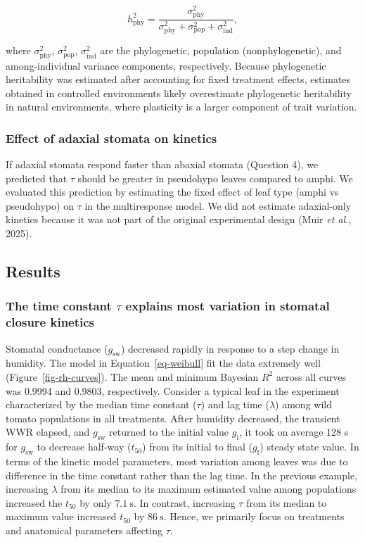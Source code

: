 \documentclass[
  letterpaper,
  DIV=11,
  numbers=noendperiod]{scrartcl}
\newcommand{\gi}{$g_\mathrm{i}$}
\newcommand{\gf}{$g_\mathrm{f}$}
\newcommand{\gsw}{$g_\mathrm{sw}$}
\begin{document}
\[h^2_{\mathrm{phy}} = \frac{\sigma^2_\mathrm{phy}}{\sigma^2_\mathrm{phy} + \sigma^2_\mathrm{pop} + \sigma^2_\mathrm{ind}},\]

where \(\sigma^2_\mathrm{phy}\), \(\sigma^2_\mathrm{pop}\),
\(\sigma^2_\mathrm{ind}\) are the phylogenetic, population
(nonphylogenetic), and among-individual variance components,
respectively. Because phylogenetic heritability was estimated after
accounting for fixed treatment effects, estimates obtained in controlled
environments likely overestimate phylogenetic heritability in natural
environments, where plasticity is a larger component of trait variation.

\subsubsection{Effect of adaxial stomata on
kinetics}\label{effect-of-adaxial-stomata-on-kinetics}

If adaxial stomata respond faster than abaxial stomata (Question 4), we
predicted that \(\tau\) should be greater in pseudohypo leaves compared
to amphi. We evaluated this prediction by estimating the fixed effect of
leaf type (amphi vs pseudohypo) on \(\tau\) in the multiresponse model.
We did not estimate adaxial-only kinetics because it was not part of the
original experimental design (Muir \emph{et al.}, 2025).

\subsection{Results}\label{results}

\subsubsection{\texorpdfstring{The time constant \(\tau\) explains most
variation in stomatal closure
kinetics}{The time constant \textbackslash tau explains most variation in stomatal closure kinetics}}\label{the-time-constant-tau-explains-most-variation-in-stomatal-closure-kinetics}

Stomatal conductance (\gsw) decreased rapidly in response to a step
change in humidity. The model in Equation~\ref{eq-weibull} fit the data
extremely well (Figure~\ref{fig-rh-curves}). The mean and minimum
Bayesian \(R^2\) across all curves was 0.9994 and 0.9803, respectively.
Consider a typical leaf in the experiment characterized by the median
time constant (\(\tau\)) and lag time (\(\lambda\)) among wild tomato
populations in all treatments. After humidity decreased, the transient
WWR elapsed, and \gsw{} returned to the initial value \gi, it took on
average 128 s for \gsw{} to decrease half-way (\(t_{50}\)) from its
initial to final (\gf) steady state value. In terms of the kinetic model
parameters, most variation among leaves was due to difference in the
time constant rather than the lag time. In the previous example,
increasing \(\lambda\) from its median to its maximum estimated value
among populations increased the \(t_{50}\) by only
\(\SI{7.1}{\second}\). In contrast, increasing \(\tau\) from its median
to maximum value increased \(t_{50}\) by \(\SI{86}{\second}\). Hence, we
primarily focus on treatments and anatomical parameters affecting
\(\tau\).
\end{document}
